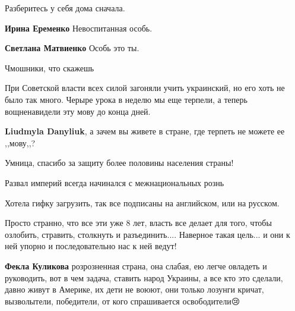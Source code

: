\begin{itemize}
\begin{itemize}
Разберитесь у себя дома сначала.

\textbf{Ирина Еременко} Невоспитанная особь.

\textbf{Светлана Матвиенко} Особь это ты.

\end{itemize}

Чмошники, что скажешь


При Советской власти всех силой загоняли учить украинский, но его хоть не было
так много. Черыре урока в неделю мы еще терпели, а теперь вощненавидели эту
мову до конца дней.

\begin{itemize}
\textbf{Liudmyla Danyliuk}, а зачем вы живете в стране, где терпеть не можете ее ,,мову,,?
\end{itemize}


Умница, спасибо за защиту более половины населения страны!

Развал империй всегда начинался с межнациональных рознь

Хотела гифку загрузить, так все подписаны на английском, или на русском.

Просто странно, что все эти уже 8 лет, власть все делает для того, чтобы
озлобить, стравить, столкнуть и разъединить.... Наверное такая цель... и они к
ней упорно и последовательно нас к ней ведут!

\begin{itemize}
\textbf{Фекла Куликова} розрозненная страна, она слабая, ею легче овладеть и
руководить, вот в чем задача, ставить народ Украины, а все кто это сделали,
давно живут в Америке, их дети не воюют, они только лозунги кричат,
вызволытели, победители, от кого спрашивается освободители😢
\end{itemize}


\end{itemize}

